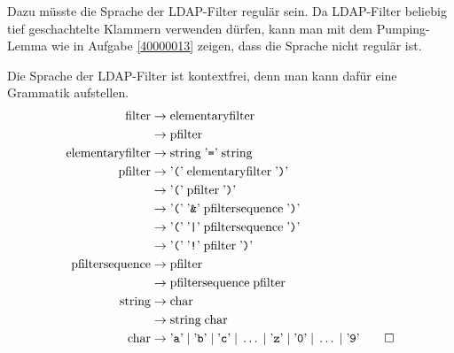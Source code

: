 \begin{loesung}
\begin{teilaufgaben}
\item
Dazu müsste die Sprache der LDAP-Filter regulär sein.
Da LDAP-Filter beliebig tief geschachtelte Klammern verwenden dürfen,
kann man mit dem Pumping-Lemma wie in Aufgabe \ref{40000013} zeigen,
dass die Sprache nicht regulär ist.
\item
Die Sprache der LDAP-Filter ist kontextfrei, denn man kann dafür
eine Grammatik aufstellen.
\begin{align*}
\text{filter}
        &\rightarrow\text{elementaryfilter}\\
        &\rightarrow\text{pfilter}\\
\text{elementaryfilter}
        &\rightarrow \text{string} \;\text{'{\tt =}'}\; \text{string}\\
\text{pfilter}
        &\rightarrow \text{'{\tt (}'}\;\text{elementaryfilter}\;\text{'{\tt )}'} \\
        &\rightarrow \text{'{\tt (}'}\;\text{pfilter}\;\text{'{\tt )}'} \\
        &\rightarrow \text{'{\tt (}'}\; \text{'{\tt \&}'}\;
                \text{pfiltersequence}\;\text{'{\tt )}'} \\
        &\rightarrow \text{'{\tt (}'}\; \text{'{\tt |}'}\;
                \text{pfiltersequence}\;\text{'{\tt )}'} \\
        &\rightarrow \text{'{\tt (}'}\; \text{'{\tt !}'}\;
                \text{pfilter}\;\text{'{\tt )}'} \\
\text{pfiltersequence}
        &\rightarrow \text{pfilter}\\
        &\rightarrow \text{pfiltersequence}\;\text{pfilter}\\
\text{string}
        &\rightarrow \text{char}\\
        &\rightarrow \text{string} \; \text{char}\\
\text{char}
        &\rightarrow
\text{'{\tt a}'}\;|\;
\text{'{\tt b}'}\;|\;
\text{'{\tt c}'}\;|\;\dots\;|\;
\text{'{\tt z}'}\;|\;
\text{'{\tt 0}'}\;|\;\dots\;|\;
\text{'{\tt 9}'}
\qedhere
\end{align*}
\end{teilaufgaben}
\end{loesung}

